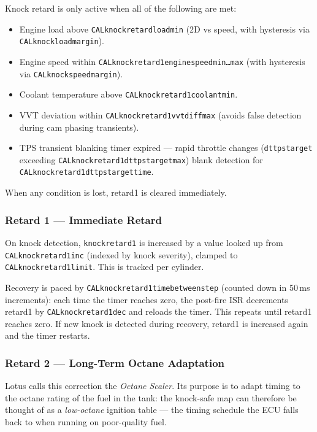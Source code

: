 \documentclass[a4paper,11pt]{article}
\renewcommand{\_}{\oldunderscore\allowbreak}
\begin{document}
Knock retard is only active when all of the following are met:
\begin{itemize}
\item Engine load above \texttt{CAL\_knock\_retard\_load\_min} (2D vs speed,
      with hysteresis via \texttt{CAL\_knock\_load\_margin}).
\item Engine speed within
      \texttt{CAL\_knock\_retard1\_engine\_speed\_min\ldots max}
      (with hysteresis via \texttt{CAL\_knock\_speed\_margin}).
\item Coolant temperature above \texttt{CAL\_knock\_retard1\_coolant\_min}.
\item VVT deviation within \texttt{CAL\_knock\_retard1\_vvt\_diff\_max}
      (avoids false detection during cam phasing transients).
\item TPS transient blanking timer expired --- rapid throttle changes
      (\texttt{dt\_tps\_target\_2} exceeding
      \texttt{CAL\_knock\_retard1\_dt\_tps\_target\_2\_max})
      blank detection for \texttt{CAL\_knock\_retard1\_dt\_tps\_target\_2\_time}.
\end{itemize}
When any condition is lost, retard1 is cleared immediately.

\subsubsection*{Retard 1 --- Immediate Retard}

On knock detection, \texttt{knock\_retard1} is increased by a value looked up
from \texttt{CAL\_knock\_retard1\_inc} (indexed by knock severity), clamped to
\texttt{CAL\_knock\_retard1\_limit}. This is tracked per cylinder.

Recovery is paced by \texttt{CAL\_knock\_retard1\_time\_between\_step}
(counted down in 50\,ms increments): each time the timer reaches zero, the
post-fire ISR decrements retard1 by \texttt{CAL\_knock\_retard1\_dec} and
reloads the timer. This repeats until retard1 reaches zero. If new knock is
detected during recovery, retard1 is increased again and the timer restarts.

\subsubsection*{Retard 2 --- Long-Term Octane Adaptation}

Lotus calls this correction the \emph{Octane Scaler}. Its purpose is to
adapt timing to the octane rating of the fuel in the tank: the knock-safe
map can therefore be thought of as a \emph{low-octane} ignition table ---
the timing schedule the ECU falls back to when running on poor-quality fuel.
\end{document}
